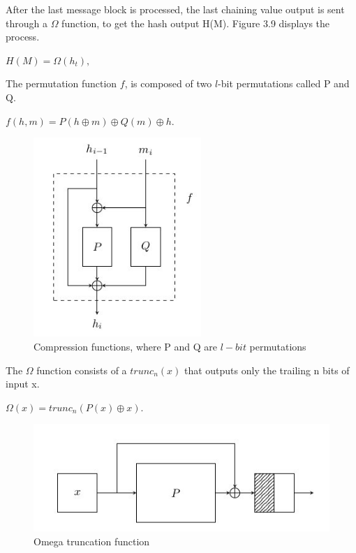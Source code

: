   After the last message block is processed, the last chaining value output is sent through a $\Omega$ function, to get
  the hash output H(M). Figure 3.9 displays the process.
  \begin{center}$H(M) = \Omega(h_{t}),$\end{center}
  The permutation function $f$, is composed of two $l$-bit permutations called P and Q.
  \begin{center}$f(h, m) = P(h \oplus m) \oplus Q(m) \oplus h.$\end{center}
  
  \begin{figure}
    \begin{center}
      \includegraphics[width=2.5in]{groestlPQfunction.jpg}
    \end{center}
    \caption{Compression functions, where P and Q are $l-bit$ permutations \cite{00019}}
    \label{fig:lab}
  \end{figure}

  The $\Omega$ function consists of a $trunc_{n}(x)$ that outputs only the trailing n bits of input x.
  \begin{center}$\Omega(x) = trunc_{n}( P(x) \oplus x ).$\end{center}

  \begin{figure}
    \begin{center}
      \includegraphics[width=4.5in]{groestlomegafunction.jpg}
    \end{center}
    \caption{Omega truncation function \cite{00019}}
    \label{fig:lab}
  \end{figure}

